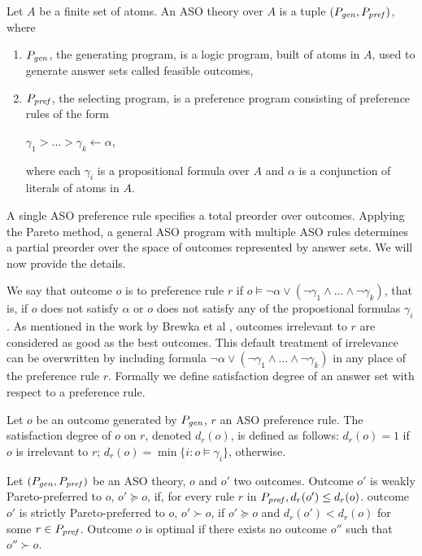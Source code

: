 \begin{definition}
	Let $A$ be a finite set of atoms.
	An ASO theory over $A$ is a tuple $(P_{\mathit{gen}},P_{\mathit{pref}})$, where
	\begin{enumerate} \itemsep -4pt
		\item $P_{\mathit{gen}}$, the generating program, is a logic program, 
					built of atoms in $A$,
					used to generate answer sets called feasible outcomes,
		\item $P_{\mathit{pref}}$, the selecting program, is a preference
					program consisting of preference rules of the form
			\begin{center}
				$\gamma_1 > \ldots > \gamma_k \leftarrow \alpha$,
			\end{center}
					where each $\gamma_i$ is a propositional formula
					over $A$ and $\alpha$ is a conjunction of
					literals of atoms in $A$.
	\end{enumerate}
\end{definition}


A single ASO preference rule specifies a total preorder over outcomes.
Applying the Pareto method, a general ASO program with multiple ASO rules
determines a partial preorder over the space of outcomes represented by answer sets.
We will now provide the details.

We say that outcome $o$ is  to preference rule $r$ if
$o \models \neg \alpha \vee (\neg \gamma_1 \wedge \ldots \wedge \neg \gamma_k)$,
that is, if $o$ does not satisfy $\alpha$ or $o$ does not satisfy any of
the propostional formulas $\gamma_i$. As mentioned in the work by Brewka et al \cite{Brewka03answerset},
outcomes irrelevant to $r$ are considered as good as the
best outcomes.
This default treatment of irrelevance can be overwritten by
including formula $\neg \alpha \vee (\neg \gamma_1 \wedge \ldots \wedge \neg \gamma_k)$
in any place of the preference rule $r$.
Formally we define satisfaction degree of an answer set with respect to a
preference rule.
\begin{definition}
	Let $o$ be an outcome generated by $P_{\mathit{gen}}$,
	$r$ an ASO preference rule.
	The satisfaction degree of $o$ on $r$, denoted $d_r(o)$,
	is defined as follows: $d_r(o)=1$ if $o$ is irrelevant to $r$;
	$d_r(o)=\min\{i:o \models \gamma_i\}$, otherwise.
\end{definition}

\begin{definition}
	Let $(P_{\mathit{gen}}, P_{\mathit{pref}})$ be an ASO theory,
	$o$ and $o'$ two outcomes.
	Outcome $o'$ is weakly Pareto-preferred to $o$, $o' \succeq o$,
	if, for every rule $r$ in $P_{\mathit{pref}}, d_r(o') \leq d_r(o)$.
	outcome $o'$ is strictly Pareto-preferred to $o$, $o' \succ o$,
	if $o' \succeq o$ and $d_r(o') < d_r(o)$ for some $r \in P_{\mathit{pref}}$.
	Outcome $o$ is optimal if there exists no outcome $o''$ such that
	$o'' \succ o$.
\end{definition}

